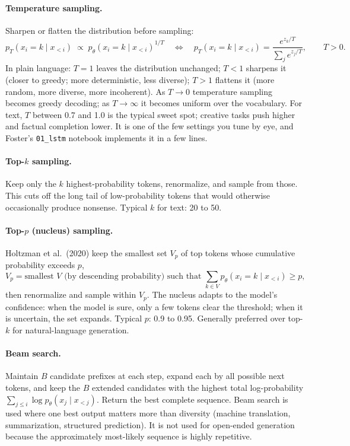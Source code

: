 \documentclass[11pt]{article}
\theoremstyle{remark}
\begin{document}
\paragraph{Temperature sampling.} Sharpen or flatten the distribution before sampling:
\begin{equation}
p_T(x_i = k \mid x_{<i}) \;\propto\; p_\theta(x_i = k \mid x_{<i})^{1/T}
\quad\Longleftrightarrow\quad
p_T(x_i = k \mid x_{<i}) = \frac{e^{z_k / T}}{\sum_j e^{z_j / T}}, \qquad T > 0.
\label{eq:temperature}
\end{equation}
In plain language: $T = 1$ leaves the distribution unchanged; $T < 1$ sharpens it (closer to greedy; more deterministic, less diverse); $T > 1$ flattens it (more random, more diverse, more incoherent). As $T \to 0$ temperature sampling becomes greedy decoding; as $T \to \infty$ it becomes uniform over the vocabulary. For text, $T$ between 0.7 and 1.0 is the typical sweet spot; creative tasks push higher and factual completion lower. It is one of the few settings you tune by eye, and Foster's \texttt{01\_lstm} notebook implements it in a few lines.

\paragraph{Top-$k$ sampling.} Keep only the $k$ highest-probability tokens, renormalize, and sample from those. This cuts off the long tail of low-probability tokens that would otherwise occasionally produce nonsense. Typical $k$ for text: 20 to 50.

\paragraph{Top-$p$ (nucleus) sampling.} Holtzman et al.\ (2020) keep the smallest set $V_p$ of top tokens whose cumulative probability exceeds $p$,
\begin{equation}
V_p = \text{smallest } V \text{ (by descending probability) such that } \sum_{k \in V} p_\theta(x_i = k \mid x_{<i}) \ge p,
\end{equation}
then renormalize and sample within $V_p$. The nucleus adapts to the model's confidence: when the model is sure, only a few tokens clear the threshold; when it is uncertain, the set expands. Typical $p$: 0.9 to 0.95. Generally preferred over top-$k$ for natural-language generation.

\paragraph{Beam search.} Maintain $B$ candidate prefixes at each step, expand each by all possible next tokens, and keep the $B$ extended candidates with the highest total log-probability $\sum_{j \le i} \log p_\theta(x_j \mid x_{<j})$. Return the best complete sequence. Beam search is used where one best output matters more than diversity (machine translation, summarization, structured prediction). It is not used for open-ended generation because the approximately most-likely sequence is highly repetitive.
\end{document}
